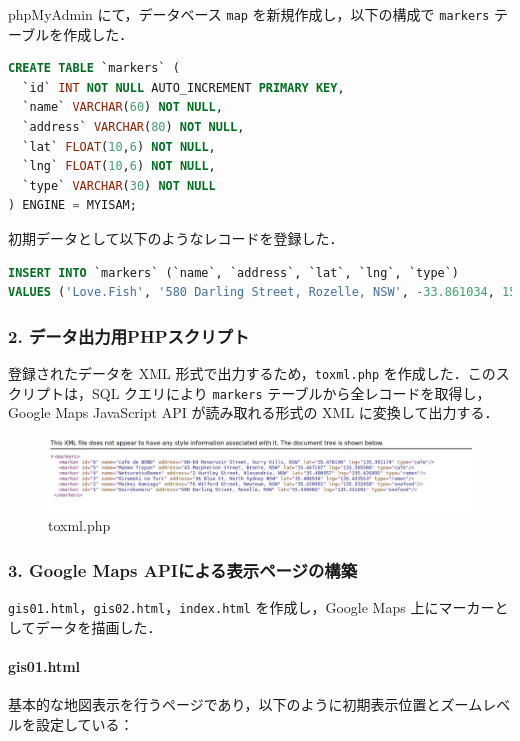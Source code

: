 phpMyAdmin にて，データベース \texttt{map} を新規作成し，以下の構成で \texttt{markers} テーブルを作成した．

\begin{lstlisting}[language=SQL]
CREATE TABLE `markers` ( 
  `id` INT NOT NULL AUTO_INCREMENT PRIMARY KEY, 
  `name` VARCHAR(60) NOT NULL, 
  `address` VARCHAR(80) NOT NULL, 
  `lat` FLOAT(10,6) NOT NULL, 
  `lng` FLOAT(10,6) NOT NULL, 
  `type` VARCHAR(30) NOT NULL 
) ENGINE = MYISAM;
\end{lstlisting}

初期データとして以下のようなレコードを登録した．

\begin{lstlisting}[language=SQL]
INSERT INTO `markers` (`name`, `address`, `lat`, `lng`, `type`)
VALUES ('Love.Fish', '580 Darling Street, Rozelle, NSW', -33.861034, 151.171936, 'restaurant');
\end{lstlisting}

\subsubsection*{2. データ出力用PHPスクリプト}

登録されたデータを XML 形式で出力するため，\texttt{toxml.php} を作成した．このスクリプトは，SQL クエリにより \texttt{markers} テーブルから全レコードを取得し，Google Maps JavaScript API が読み取れる形式の XML に変換して出力する．

\begin{figure}[htbp]
  \centering
  \includegraphics[width=0.9\linewidth]{figure/11.pdf}
  \caption{toxml.php}
\end{figure}

\subsubsection*{3. Google Maps APIによる表示ページの構築}

\texttt{gis01.html}，\texttt{gis02.html}，\texttt{index.html} を作成し，Google Maps 上にマーカーとしてデータを描画した．

\paragraph*{gis01.html}
基本的な地図表示を行うページであり，以下のように初期表示位置とズームレベルを設定している：

